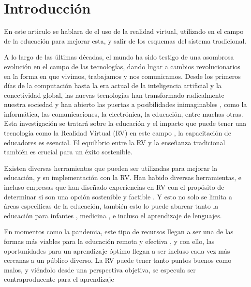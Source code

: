 \section{Introducción}

En este articulo se hablara de el uso de la realidad virtual, utilizado en el campo de la educación para mejorar esta, y salir de los esquemas del sistema tradicional.

A lo largo de las últimas décadas, el mundo ha sido testigo de una asombrosa evolución en el campo de las tecnologías, dando lugar a cambios revolucionarios en la forma en que vivimos, trabajamos y nos comunicamos. Desde los primeros días de la computación hasta la era actual de la inteligencia artificial y la conectividad global, las nuevas tecnologías han transformado radicalmente nuestra sociedad y han abierto las puertas a posibilidades inimaginables \parencite{zheng1998virtual}, como la informática, las comunicaciones, la electrónica, la educación, entre muchas otras. Esta investigación se tratar\'a sobre la educación y el impacto que puede tener una tecnología como la Realidad Virtual (RV) en este campo \parencite{garcia2020}, la capacitación de educadores es esencial. El equilibrio entre la RV y la enseñanza tradicional también es crucial para un éxito sostenible.

Existen diversas herramientas que pueden ser utilizadas para mejorar la educación, y su implementación con la RV. Han habido diversas herramientas, e incluso empresas que han diseñado experiencias en RV con el propósito de determinar si son una opción sostenible y factible \parencite{SHIM2023100010}. Y esto no solo se limita a áreas especificas de la educación, también esto lo puede abarcar tanto la educación para infantes \parencite{marin2022realidad}, medicina \parencite{GUERRERO2022100002}, e incluso el aprendizaje de lenguajes. \parencite{YUDINTSEVA2023100018, ZAMMIT2023100035}

En momentos como la pandemia, este tipo de recursos llegan a ser una de las formas m\'as viables para la educación remota y efectiva \parencite{GUERRERO2022100002}, y con ello, las oportunidades para un aprendizaje \'optimo llegan a ser incluso cada vez m\'as cercanas a un p\'ublico diverso. La RV puede tener tanto puntos buenos como malos, y vi\'endolo desde una perspectiva objetiva, se especula ser contraproducente para el aprendizaje \parencite{OJE2023100033}




